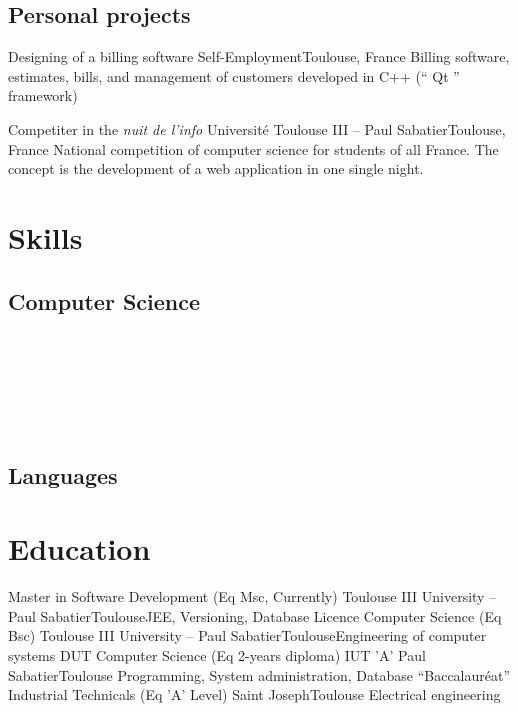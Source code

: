 \documentclass{my_cv_bis_en}
\begin{document}
	\subsection{Personal projects}
	{Designing of a billing software}
	{Self-Employment}{Toulouse, France}
	{Billing software, estimates, bills, and management of customers developed in C++ (`` Qt '' framework)
	} 
	{}

	{Competiter in the \textit{nuit de l'info}}
	{Université Toulouse III -- Paul Sabatier}{Toulouse, France}
	{ National competition of computer science for students of all France. The concept is the development of a web application in one single
	night.} 
	{\vspace{20px}}
		\newpage
\section{Skills}
		\subsection{Computer Science}
		\\
		\\
		\\
		\\
		\\
		\subsection{Languages}

	\section{Education}
	{Master in Software Development (Eq Msc, Currently)}
	{Toulouse III University -- Paul Sabatier}{Toulouse}{JEE, Versioning, Database}{}
	{Licence Computer Science (Eq Bsc)}
	{Toulouse III University -- Paul Sabatier}{Toulouse}{Engineering of computer systems}{}
	{DUT Computer Science (Eq 2-years diploma)}
	{IUT 'A' Paul Sabatier}{Toulouse}
	{Programming, System administration, Database}
	{}
	{``Baccalauréat'' Industrial Technicals (Eq 'A' Level)}
	{Saint Joseph}{Toulouse}
	{Electrical engineering}{}
\end{document}

